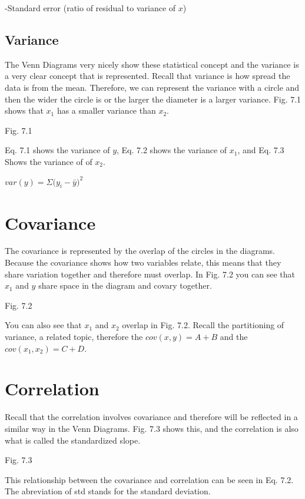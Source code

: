 \documentclass[]{book}
\theoremstyle{definition}
\theoremstyle{definition}
\theoremstyle{definition}
\theoremstyle{remark}
\begin{document}
-Standard error (ratio of residual to variance of \(x\))

\hypertarget{variance}{%
\subsection{Variance}\label{variance}}

The Venn Diagrams very nicely show these statistical concept and the
variance is a very clear concept that is represented. Recall that
variance is how spread the data is from the mean. Therefore, we can
represent the variance with a circle and then the wider the circle is or
the larger the diameter is a larger variance. Fig. 7.1 shows that
\(x_1\) has a smaller variance than \(x_2\).

Fig. 7.1

Eq. 7.1 shows the variance of \(y\), Eq. 7.2 shows the variance of
\(x_1\), and Eq. 7.3 Shows the variance of of \(x_2\).

\(var(y) = \Sigma{(y_i} - \bar{y})^2\)

\hypertarget{covariance-1}{%
\section{Covariance}\label{covariance-1}}

The covariance is represented by the overlap of the circles in the
diagrams. Because the covariance shows how two variables relate, this
means that they share variation together and therefore must overlap. In
Fig. 7.2 you can see that \(x_1\) and \(y\) share space in the diagram
and covary together.

Fig. 7.2

You can also see that \(x_1\) and \(x_2\) overlap in Fig. 7.2. Recall
the partitioning of variance, a related topic, therefore the
\(cov(x,y) = A+B\) and the \(cov(x_1,x_2) = C+D\).

\hypertarget{correlation}{%
\section{Correlation}\label{correlation}}

Recall that the correlation involves covariance and therefore will be
reflected in a similar way in the Venn Diagrams. Fig. 7.3 shows this,
and the correlation is also what is called the standardized slope.

Fig. 7.3

This relationship between the covariance and correlation can be seen in
Eq. 7.2. The abreviation of std stands for the standard deviation.
\end{document}
